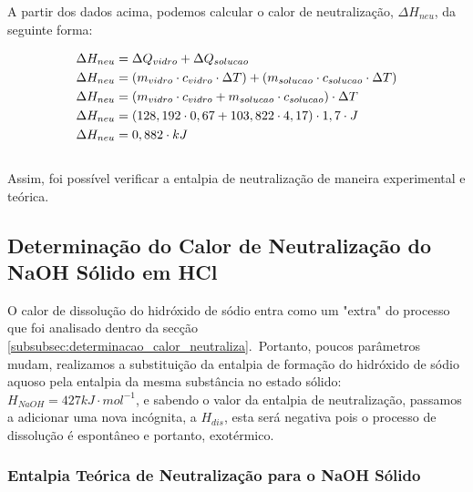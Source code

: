             \indent A partir dos dados acima, podemos calcular o calor de neutralização, $\Delta{H_{neu}}$, da seguinte forma:\
            
            \begin{equation}
                \begin{split}
                	\notag
                    \Delta{H_{neu}} &= \Delta Q_{vidro} + \Delta Q_{solucao} \\
                    \Delta{H_{neu}} &= (m_{vidro} \cdot c_{vidro} \cdot \Delta T) + (m_{solucao} \cdot c_{solucao} \cdot \Delta T) \\
                    \Delta{H_{neu}} &= (m_{vidro} \cdot c_{vidro} + m_{solucao} \cdot c_{solucao}) \cdot \Delta T \\
                    \Delta{H_{neu}} &= (128,192 \cdot 0,67 + 103,822 \cdot 4,17) \cdot 1,7 \cdot J \\
                    \Delta{H_{neu}} &= 0,882 \cdot kJ
                \end{split}
            \end{equation}\\

            \indent Assim, foi possível verificar a entalpia de neutralização de maneira experimental e teórica.\\     
        
            
            \subsection{Determinação do Calor de Neutralização do NaOH Sólido em HCl}\label{subsubsec:determinacao_calor_dissolucao}
            \indent O calor de dissolução do hidróxido de sódio entra como um "extra" do processo que foi analisado dentro da secção \ref{subsubsec:determinacao_calor_neutraliza}.\ Portanto, poucos parâmetros mudam, realizamos a substituição da entalpia de formação do hidróxido de sódio aquoso pela entalpia da mesma substância no estado sólido: $H_{NaOH} = 427 kJ \cdot mol^{-1}$, e sabendo o valor da entalpia de neutralização, passamos a adicionar uma nova incógnita, a $H_{dis}$, esta será negativa pois o processo de dissolução é espontâneo e portanto, exotérmico.\
            
            \subsubsection{Entalpia Teórica de Neutralização para o NaOH Sólido}
            
